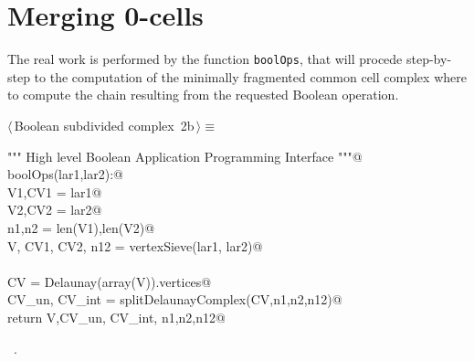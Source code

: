 \documentclass[11pt,oneside]{article}	%
\begin{document}
\section{Merging 0-cells}

The real work is performed by the function \texttt{boolOps}, that will procede step-by-step to the computation of the minimally fragmented common cell complex where to compute the chain resulting from the requested Boolean operation.

\begin{flushleft} \small
\begin{minipage}{\linewidth} \label{scrap2}
\protect{}$\langle\,$Boolean subdivided complex\nobreak\ {\footnotesize 2b}$\,\rangle\equiv$
\vspace{-1ex}
\begin{list}{}{} \item
\mbox{}\verb@""" High level Boolean Application Programming Interface """@\\
\mbox{}\verb@def boolOps(lar1,lar2):@\\
\mbox{}\verb@   V1,CV1 = lar1@\\
\mbox{}\verb@   V2,CV2 = lar2@\\
\mbox{}\verb@   n1,n2 = len(V1),len(V2)@\\
\mbox{}\verb@   V, CV1, CV2, n12 = vertexSieve(lar1, lar2)@\\
\mbox{}\verb@@\\
\mbox{}\verb@   CV = Delaunay(array(V)).vertices@\\
\mbox{}\verb@   CV_un, CV_int = splitDelaunayComplex(CV,n1,n2,n12)@\\
\mbox{}\verb@   return V,CV_un, CV_int, n1,n2,n12@\\
\mbox{}\verb@@{\NWsep}
\end{list}
\vspace{-1ex}
\footnotesize\addtolength{\baselineskip}{-1ex}
\begin{list}{}{\setlength{\itemsep}{-\parsep}\setlength{\itemindent}{-\leftmargin}}
\item \NWtxtMacroRefIn\ .
\end{list}
\end{minipage}\\[4ex]
\end{flushleft}
\end{document}
